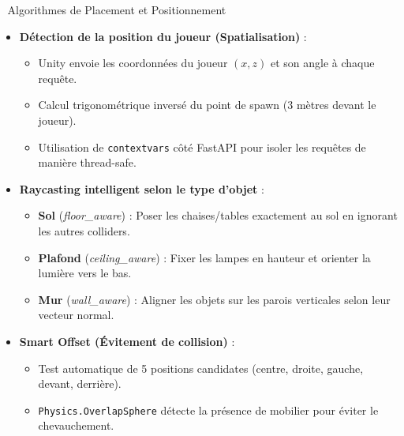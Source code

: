 \documentclass[aspectratio=169]{beamer}
\begin{document}
\begin{frame}{📐 Algorithmes de Placement et Positionnement}
  \begin{itemize}
    \item \textbf{Détection de la position du joueur (Spatialisation)} :
      \begin{itemize}
        \item Unity envoie les coordonnées du joueur $(x, z)$ et son angle à chaque requête.
        \item Calcul trigonométrique inversé du point de spawn (3 mètres devant le joueur).
        \item Utilisation de \texttt{contextvars} côté FastAPI pour isoler les requêtes de manière thread-safe.
      \end{itemize}
    \item \textbf{Raycasting intelligent selon le type d'objet} :
      \begin{itemize}
        \item \textbf{Sol} (\textit{floor\_aware}) : Poser les chaises/tables exactement au sol en ignorant les autres colliders.
        \item \textbf{Plafond} (\textit{ceiling\_aware}) : Fixer les lampes en hauteur et orienter la lumière vers le bas.
        \item \textbf{Mur} (\textit{wall\_aware}) : Aligner les objets sur les parois verticales selon leur vecteur normal.
      \end{itemize}
    \item \textbf{Smart Offset (Évitement de collision)} :
      \begin{itemize}
        \item Test automatique de 5 positions candidates (centre, droite, gauche, devant, derrière).
        \item \texttt{Physics.OverlapSphere} détecte la présence de mobilier pour éviter le chevauchement.
      \end{itemize}
  \end{itemize}

\end{frame}
\end{document}
